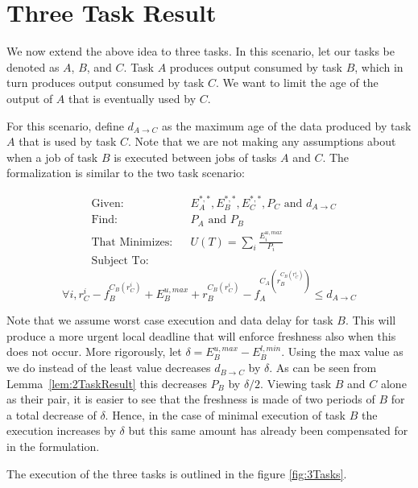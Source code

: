 \section{Three Task Result}

We now extend the above idea to three tasks. In this scenario, let our tasks be denoted as $A$, $B$, and $C$. Task $A$ produces output consumed by task $B$, which in turn produces output consumed by task $C$. We want to limit the age of the output of $A$ that is eventually used by $C$.

For this scenario, define $d_{A \to C}$ as the maximum age of the data produced by task $A$ that is used by task $C$. Note that we are not making any assumptions about when a job of task $B$ is executed between jobs of tasks $A$ and $C$. The formalization is similar to the two task scenario:

\begin{equation*}
	\begin{aligned}
		& \text{Given:}
		& & E^{*,*}_A, E^{*,*}_B, E^{*,*}_C, P_C \text{ and } d_{A \to C} \\
		& \text{Find:}
		& & P_A \text{ and } P_B \\
		& \text{That Minimizes:}
		& & U(T) = \sum_i \frac{E_i^{u,max}}{P_i} \\
		& \text{Subject To:}
		& & 
	\end{aligned}
\end{equation*}
\begin{equation*}
	\forall i, r^i_C - f_B^{C_B(r^i_C)} + E^{u,max}_B + r_B^{C_B(r^i_C)} - f_A^{C_A(r_B^{C_B(r^i_C)})} \leq d_{A \to C}
\end{equation*}

\noindent Note that we assume worst case execution and data delay for task $B$. This will produce a more urgent local deadline that will enforce freshness also when this does not occur. More rigorously, let $\delta = E_B^{u,max} - E_B^{l,min}$. Using the max value as we do instead of the least value decreases $d_{B \to C}$ by $\delta$. As can be seen from Lemma~\ref{lem:2TaskResult} this decreases $P_B$ by $\delta / 2$. Viewing task $B$ and $C$ alone as their pair, it is easier to see that the freshness is made of two periods of $B$ for a total decrease of $\delta$. Hence, in the case of minimal execution of task $B$ the execution increases by $\delta$ but this same amount has already been compensated for in the formulation.

The execution of the three tasks is outlined in the figure \ref{fig:3Tasks}.

